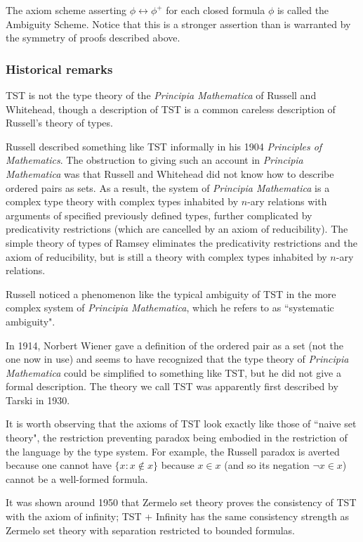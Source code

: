 \documentclass[12pt]{article}
\begin{document}
The axiom scheme asserting $\phi \leftrightarrow \phi^+$ for each closed formula $\phi$ is called the Ambiguity Scheme.   Notice that this is a stronger assertion than is warranted by the symmetry of proofs described above.

\subsubsection{Historical remarks}

TST is not the type theory of the {\em Principia Mathematica\/} of Russell and Whitehead, though a description of TST is a common careless description of Russell's theory of types.

Russell described something like TST informally in his 1904 {\em Principles of Mathematics\/}.  The obstruction to giving such an account in {\em Principia Mathematica\/} was that
Russell and Whitehead did not know how to describe ordered pairs as sets.  As a result, the system of {\em Principia Mathematica\/} is a complex type theory with complex
types inhabited by $n$-ary relations with arguments of specified previously defined types, further complicated by predicativity restrictions (which are cancelled by an axiom of reducibility).
The simple theory of types of Ramsey eliminates the predicativity restrictions and the axiom of reducibility, but is still a theory with complex types inhabited by $n$-ary relations.

Russell noticed a phenomenon like the typical ambiguity of TST in the more complex system of {\em Principia Mathematica\/}, which he refers to as ``systematic ambiguity".

In 1914, Norbert Wiener gave a definition of the ordered pair as a set (not the one now in use) and seems to have recognized that the type theory of {\em Principia Mathematica\/} could be simplified to something like TST, but he did not give a formal description.  The theory we call TST was apparently first described by Tarski in 1930.

It is worth observing that the axioms of TST look exactly like those of ``naive set theory", the restriction preventing paradox being embodied in the restriction of the language by the type system.
For example, the Russell paradox is averted because one cannot have $\{x:x \not\in x\}$ because $x \in x$ (and so its negation $\neg x \in x$) cannot be a well-formed formula.

It was shown around 1950 that Zermelo set theory proves the consistency of TST with the axiom of infinity;  TST + Infinity has the same consistency strength as
Zermelo set theory with separation restricted to bounded formulas.
\end{document}
